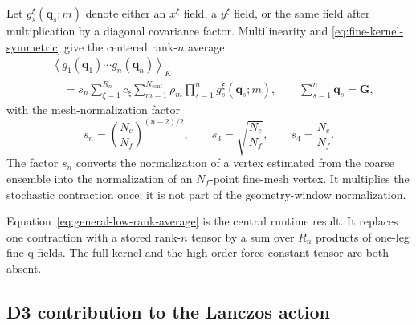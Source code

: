 \documentclass{article}
\newcommand{\Nc}{N_c}
\newcommand{\Nf}{N_f}
\begin{document}
Let $g_s^\xi(\bm q_s;m)$ denote either an $x^\xi$ field, a $y^\xi$ field,
or the same field after multiplication by a diagonal covariance factor.
Multilinearity and \autoref{eq:fine-kernel-symmetric} give the centered
rank-$n$ average
\begin{align}
    &\left\langle
    g_1(\bm q_1)\cdots g_n(\bm q_n)
    \right\rangle_K
    \nonumber\\
    &\quad =
    s_n
    \sum_{\xi=1}^{R_n}c_\xi
    \sum_{m=1}^{N_{\mathrm{conf}}}\rho_m
    \prod_{s=1}^{n}g_s^\xi(\bm q_s;m),
    \qquad
    \sum_{s=1}^{n}\bm q_s=\bm G,
    \label{eq:general-low-rank-average}
\end{align}
with the mesh-normalization factor
\begin{equation}
    s_n=
    \left(\frac{\Nc}{\Nf}\right)^{(n-2)/2},
    \qquad
    s_3=\sqrt{\frac{\Nc}{\Nf}},
    \qquad
    s_4=\frac{\Nc}{\Nf}.
    \label{eq:fine-vertex-scaling}
\end{equation}
The factor $s_n$ converts the normalization of a vertex estimated from the
coarse ensemble into the normalization of an $\Nf$-point fine-mesh vertex.
It multiplies the stochastic contraction once; it is not part of the
geometry-window normalization.

Equation~\eqref{eq:general-low-rank-average} is the central runtime result.
It replaces one contraction with a stored rank-$n$ tensor by a sum over
$R_n$ products of one-leg fine-q fields. The full kernel and the high-order
force-constant tensor are both absent.

\subsection{D3 contribution to the Lanczos action}
\label{sec:fine-d3-action}
\end{document}
